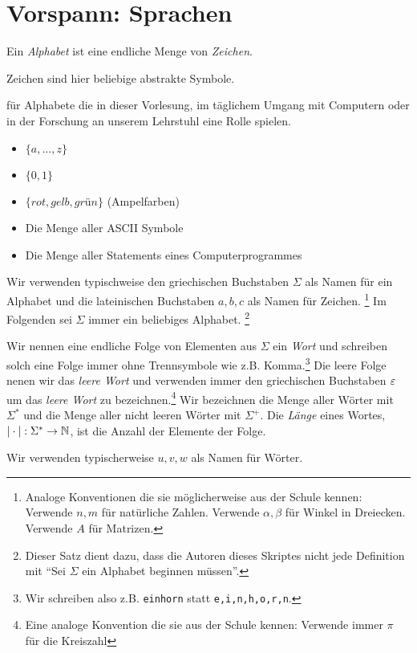 \section[Vorspann: Sprachen]{Vorspann: Sprachen}
\begin{Def}[name={[Alphabet $\Sigma$]}]
	Ein \emph{Alphabet} ist eine endliche Menge von \emph{Zeichen}.
\end{Def} %
Zeichen sind hier beliebige abstrakte Symbole.

\newcommand{\aro}{\textit{rot}}
\newcommand{\age}{\textit{gelb}}
\newcommand{\agr}{\textit{grün}}

\begin{Bsp*} für Alphabete die in dieser Vorlesung, im täglichem Umgang mit Computern oder in der Forschung an unserem Lehrstuhl eine Rolle spielen.
  \begin{itemize}
  \item $\{a,\dots,z\}$
  \item $\{0, 1\}$
  \item $\{\aro, \age, \agr\}$ (Ampelfarben)
  \item Die Menge aller ASCII Symbole
  \item Die Menge aller Statements eines Computerprogrammes
  \end{itemize}
\end{Bsp*}
Wir verwenden typischweise den griechischen Buchstaben $\Sigma$ als Namen für ein Alphabet und die lateinischen Buchstaben $a,b,c$ als Namen für Zeichen.
\footnote{Analoge Konventionen die sie möglicherweise aus der Schule kennen: Verwende $n,m$ für natürliche Zahlen. Verwende $\alpha, \beta$ für Winkel in Dreiecken. Verwende $A$ für Matrizen.}
Im Folgenden sei $\Sigma$ immer ein beliebiges Alphabet.
\footnote{Dieser Satz dient dazu, dass die Autoren dieses Skriptes nicht jede Definition mit ``Sei $\Sigma$ ein Alphabet beginnen müssen''.}

\begin{Def}[name={[Wort $w$ über $\Sigma$]}]\label{def:1.2}
  Wir nennen eine endliche Folge von Elementen aus $\Sigma$ ein \emph{Wort}
  und schreiben solch eine Folge immer ohne Trennsymbole wie z.B. Komma.\footnote{Wir schreiben also z.B. \texttt{einhorn} statt \texttt{e,i,n,h,o,r,n}.}
  Die leere Folge nenen wir das \emph{leere Wort} und verwenden immer den griechischen Buchstaben $\varepsilon$ um das \emph{leere Wort} zu bezeichnen.\footnote{Eine analoge Konvention die sie aus der Schule kennen: Verwende immer $\pi$ für die Kreiszahl}
  Wir bezeichnen die Menge aller Wörter mit $\Sigma^*$ und die Menge aller nicht leeren Wörter mit $\Sigma^+$.
  Die \emph{Länge} eines Wortes, $|\cdot| : \Sigma^* \to \mathbb{N}$, ist die Anzahl der Elemente der Folge.
\end{Def}
  Wir verwenden typischerweise $u,v,w$ als Namen für Wörter.

